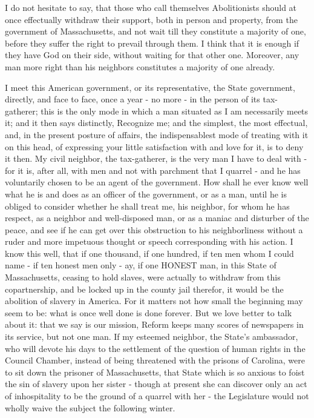 \documentclass[letterpaper,12pt,english]{sphinxmanual}
\begin{document}
I do not hesitate to say, that those who call themselves Abolitionists should at once effectually withdraw their support, both in person and property, from the government of Massachusetts, and not wait till they constitute a majority of one, before they suffer the right to prevail through them. I think that it is enough if they have God on their side, without waiting for that other one. Moreover, any man more right than his neighbors constitutes a majority of one already.

I meet this American government, or its representative, the State government, directly, and face to face, once a year - no more - in the person of its tax-gatherer; this is the only mode in which a man situated as I am necessarily meets it; and it then says distinctly, Recognize me; and the simplest, the most effectual, and, in the present posture of affairs, the indispensablest mode of treating with it on this head, of expressing your little satisfaction with and love for it, is to deny it then. My civil neighbor, the tax-gatherer, is the very man I have to deal with - for it is, after all, with men and not with parchment that I quarrel - and he has voluntarily chosen to be an agent of the government. How shall he ever know well what he is and does as an officer of the government, or as a man, until he is obliged to consider whether he shall treat me, his neighbor, for whom he has respect, as a neighbor and well-disposed man, or as a maniac and disturber of the peace, and see if he can get over this obstruction to his neighborliness without a ruder and more impetuous thought or speech corresponding with his action. I know this well, that if one thousand, if one hundred, if ten men whom I could name - if ten honest men only - ay, if one HONEST man, in this State of Massachusetts, ceasing to hold slaves, were actually to withdraw from this copartnership, and be locked up in the county jail therefor, it would be the abolition of slavery in America. For it matters not how small the beginning may seem to be: what is once well done is done forever. But we love better to talk about it: that we say is our mission, Reform keeps many scores of newspapers in its service, but not one man. If my esteemed neighbor, the State's ambassador, who will devote his days to the settlement of the question of human rights in the Council Chamber, instead of being threatened with the prisons of Carolina, were to sit down the prisoner of Massachusetts, that State which is so anxious to foist the sin of slavery upon her sister - though at present she can discover only an act of inhospitality to be the ground of a quarrel with her - the Legislature would not wholly waive the subject the following winter.
\end{document}
